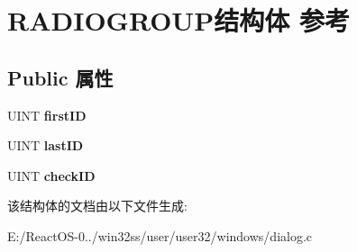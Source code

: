 \hypertarget{struct_r_a_d_i_o_g_r_o_u_p}{}\section{R\+A\+D\+I\+O\+G\+R\+O\+U\+P结构体 参考}
\label{struct_r_a_d_i_o_g_r_o_u_p}
\subsection*{Public 属性}
\begin{DoxyCompactItemize}
\item 
\mbox{\label{struct_r_a_d_i_o_g_r_o_u_p_ac8dc51e524ec511b14be6c826acefce8}} 
U\+I\+NT {\bfseries first\+ID}
\item 
\mbox{\label{struct_r_a_d_i_o_g_r_o_u_p_a253b068fcd201e0966921100004c692e}} 
U\+I\+NT {\bfseries last\+ID}
\item 
\mbox{\label{struct_r_a_d_i_o_g_r_o_u_p_a0b1b485223a4095809a1aa6cd7455623}} 
U\+I\+NT {\bfseries check\+ID}
\end{DoxyCompactItemize}


该结构体的文档由以下文件生成\+:\begin{DoxyCompactItemize}
\item 
E\+:/\+React\+O\+S-\/0../win32ss/user/user32/windows/dialog.\+c\end{DoxyCompactItemize}
